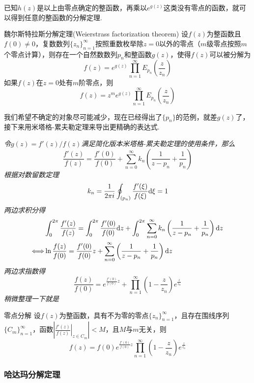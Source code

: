 \documentclass[main.tex]{subfiles}
\begin{document}
已知\(h(z)\)是以上由零点确定的整函数，再乘以\(e^{g(z)}\)这类没有零点的函数，就可以得到任意的整函数的分解定理.

\begin{theorem}{魏尔斯特拉斯分解定理(Weierstrass factorization theorem)}
    设\(f(z)\)为整函数且\(f(0)\neq 0\)，复数数列\(\{z_n\}_{n=1}^{\infty}\)按照重数枚举除\(z=0\)以外的零点（\(m\)级零点按照\(m\)个零点计算），则存在一个自然数数列\(p_n\)和整函数\(g(z)\)，使得\(f(z)\)可以被分解为
    \[f(z) = e^{g(z)}\prod_{n=1}^{\infty}E_{p_n}\left(\frac{z}{z_n}\right)\]
    如果\(f(z)\)在\(z=0\)处有\(m\)阶零点，则
    \[f(z) = z^me^{g(z)}\prod_{n=1}^{\infty}E_{p_n}\left(\frac{z}{z_n}\right)\]
\end{theorem}

我们希望不确定的对象尽可能减少，现在已经得出了\(\{p_n\}\)的范例，就差\(g(z)\)了，接下来用米塔格-累夫勒定理来导出更精确的表达式.

\textit{
    令\(g(z)=f'(z)/f(z)\)满足简化版本米塔格-累夫勒定理的使用条件，那么
    \[\frac{f'(z)}{f(z)} = \frac{f'(0)}{f(0)} + \sum_{n=0}^{\infty}k_n\left(\frac{1}{z-p_n}+\frac{1}{p_n}\right)\]
    根据对数留数定理
    \[k_n = \frac{1}{2 \pi i}\oint_{(p_n)}\frac{f'(\xi)}{f(\xi)}{\rm d}\xi = 1\]
    两边求积分得
    \begin{align*}
        & \int_{0}^{2\pi}\frac{f'(z)}{f(z)} = \int_{0}^{2\pi}\frac{f'(0)}{f(0)}{\rm d}z + \int_{0}^{2\pi}\sum_{n=0}^{\infty}k_n\left(\frac{1}{z-p_n}+\frac{1}{p_n}\right){\rm d}z \\
        \Longleftrightarrow & \ln\frac{f(z)}{f(0)} = \frac{f'(0)}{f(0)}z + \sum_{n=0}^{\infty}\left(\frac{1}{z-p_n}+\frac{1}{p_n}\right){\rm d}z
    \end{align*}
    两边求指数得
    \[\frac{f(z)}{f(0)}=e^{\frac{f'(0)}{f(0)}z}+\prod_{n=1}^{\infty}\left(1-\frac{z}{z_n}\right)e^{\frac{z}{z_n}}\]
    稍微整理一下就是
}

\begin{corollary}{零点分解}
    设\(f(z)\)为整函数，具有不为零的零点\(\{z_n\}_{n=1}^{\infty}\)，且存在围线序列\(\{C_m\}_{n=1}^{\infty}\)，函数\(\displaystyle{\left|\left.\frac{f'(z)}{f(z)}\right|_{z \in C_m}\right| < M}\)，且\(M\)与\(m\)无关，则
    \[\boxed{f(z) = f(0)e^{\frac{f'(0)}{f(0)}z}\prod_{n=1}^{\infty}\left(1-\frac{z}{z_n}\right)e^{\frac{z}{z_n}}}\]
\end{corollary}

\subsubsection{哈达玛分解定理}
\end{document}
